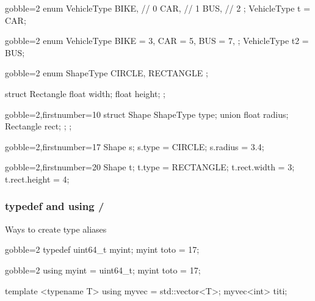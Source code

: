 \begin{frame}[fragile]
  \begin{multicols}{2}
    \begin{cppcode*}{gobble=2}
      enum VehicleType {
        BIKE,  // 0
        CAR,   // 1
        BUS,   // 2
      };
      VehicleType t = CAR;
    \end{cppcode*}
    \columnbreak
    \begin{cppcode*}{gobble=2}
      enum VehicleType {
        BIKE = 3,
        CAR = 5,
        BUS = 7,
      };
      VehicleType t2 = BUS;
    \end{cppcode*}
  \end{multicols}
\end{frame}

\begin{frame}[fragile]
  \begin{multicols}{2}
    \begin{cppcode*}{gobble=2}
      enum ShapeType {
        CIRCLE,
        RECTANGLE
      };
      
      struct Rectangle {
        float width;
        float height;
      };
    \end{cppcode*}
    \columnbreak
    \pause
    \begin{cppcode*}{gobble=2,firstnumber=10}
      struct Shape {
        ShapeType type;
        union { 
          float radius;
          Rectangle rect;
        };
      };
    \end{cppcode*}
  \end{multicols}
  \pause
  \begin{multicols}{2}
    \begin{cppcode*}{gobble=2,firstnumber=17}
      Shape s;
      s.type = CIRCLE;
      s.radius = 3.4;
      
    \end{cppcode*}
    \columnbreak
    \begin{cppcode*}{gobble=2,firstnumber=20}
      Shape t;
      t.type = RECTANGLE;
      t.rect.width = 3;
      t.rect.height = 4;
    \end{cppcode*}
  \end{multicols}
\end{frame}

\begin{frame}[fragile]
  \frametitle{typedef and using \hfill {} / }
  Ways to create type aliases
  \begin{alertblock}{}
    \begin{cppcode*}{gobble=2}
      typedef uint64_t myint;
      myint toto = 17;
    \end{cppcode*}
  \end{alertblock}
  \begin{exampleblock}{}
    \begin{cppcode*}{gobble=2}
      using myint = uint64_t;
      myint toto = 17;

      template <typename T> using myvec = std::vector<T>;
      myvec<int> titi;
    \end{cppcode*}
  \end{exampleblock}
\end{frame}

